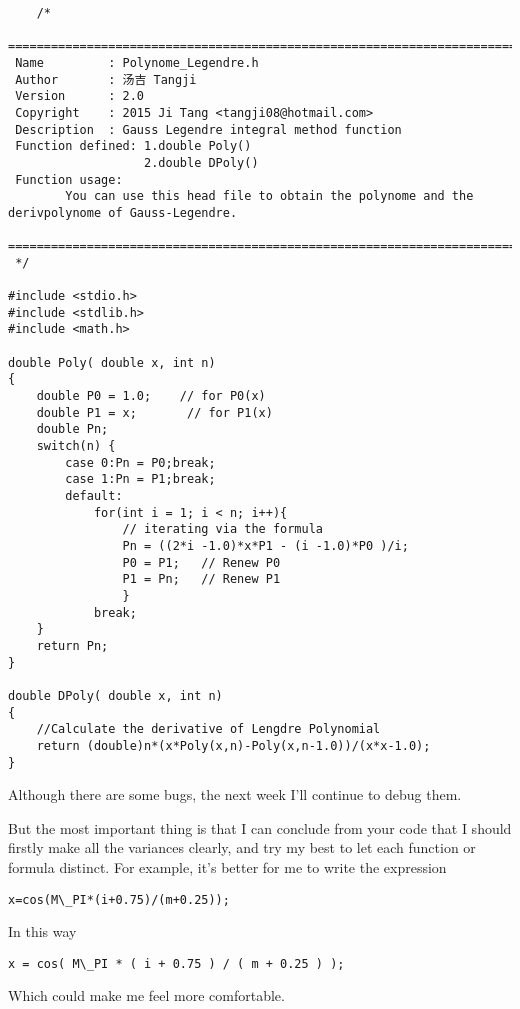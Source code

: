 \documentclass[12pt]{article}
\begin{document}
\begin{lstlisting}
	/*
 ============================================================================
 Name         : Polynome_Legendre.h
 Author       : 汤吉 Tangji
 Version      : 2.0
 Copyright    : 2015 Ji Tang <tangji08@hotmail.com>
 Description  : Gauss Legendre integral method function
 Function defined: 1.double Poly()
                   2.double DPoly()
 Function usage:
        You can use this head file to obtain the polynome and the derivpolynome of Gauss-Legendre.
 ============================================================================
 */

#include <stdio.h>
#include <stdlib.h>
#include <math.h>

double Poly( double x, int n)
{
	double P0 = 1.0;    // for P0(x)
	double P1 = x;       // for P1(x)
	double Pn;
    switch(n) {
		case 0:Pn = P0;break;
		case 1:Pn = P1;break;
		default:
			for(int i = 1; i < n; i++){
				// iterating via the formula
				Pn = ((2*i -1.0)*x*P1 - (i -1.0)*P0 )/i;
				P0 = P1;   // Renew P0
				P1 = Pn;   // Renew P1
				}
			break;
    }
	return Pn;
}

double DPoly( double x, int n)
{
	//Calculate the derivative of Lengdre Polynomial
	return (double)n*(x*Poly(x,n)-Poly(x,n-1.0))/(x*x-1.0);
}
\end{lstlisting}

Although there are some bugs, the next week I'll continue to debug them.

But the most important thing is that I can conclude from your code that I should firstly make all the variances clearly, and try my best to let each function or formula distinct. For example, it's better for me to write the expression 
\begin{lstlisting}
x=cos(M\_PI*(i+0.75)/(m+0.25));
\end{lstlisting}
In this way
\begin{lstlisting}
x = cos( M\_PI * ( i + 0.75 ) / ( m + 0.25 ) );
\end{lstlisting}

 Which could make me feel more comfortable.

 



\end{document}
